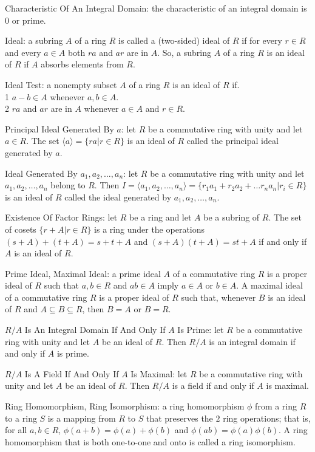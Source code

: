 Characteristic Of An Integral Domain: the characteristic of an integral domain is $0$ or prime.

Ideal: a subring $A$ of a ring $R$ is called a (two-sided) ideal of $R$ if for every $r \in R$ and every $a \in A$ both $ra$ and $ar$ are in $A$. So, a subring $A$ of a ring $R$ is an ideal of $R$ if $A$ absorbs elements from $R$.

Ideal Test: a nonempty subset $A$ of a ring $R$ is an ideal of $R$ if. \\
1 $a-b \in A$ whenever $a,b \in A$. \\
2 $ra$ and $ar$ are in $A$ whenever $a \in A$ and $r \in R$.

Principal Ideal Generated By $a$: let $R$ be a commutative ring with unity and let $a \in R$. The set $\langle a \rangle = \{ra | r \in R \}$ is an ideal of $R$ called the principal ideal generated by $a$.

Ideal Generated By $a_1,a_2,\dots,a_n$: let $R$ be a commutative ring with unity and let $a_1,a_2,\dots,a_n$ belong to $R$. Then $I = \langle a_1,a_2,\dots,a_n \rangle = \{r_1 a_1 + r_2 a_2 + \dots r_n a_n | r_i \in R \}$ is an ideal of $R$ called the ideal generated by $a_1,a_2,\dots,a_n$.

Existence Of Factor Rings: let $R$ be a ring and let $A$ be a subring of $R$. The set of cosets $\{ r+A | r \in R \}$ is a ring under the operations $(s+A)+(t+A)=s+t+A$ and $(s+A)(t+A)=st+A$ if and only if $A$ is an ideal of $R$.

Prime Ideal, Maximal Ideal: a prime ideal $A$ of a commutative ring $R$ is a proper ideal of $R$ such that $a,b \in R$ and $ab \in A$ imply $a \in A$ or $b \in A$. A maximal ideal of a commutative ring $R$ is a proper ideal of $R$ such that, whenever $B$ is an ideal of $R$ and $A \subseteq B \subseteq R$, then $B=A$ or $B=R$.

$R/A$ Is An Integral Domain If And Only If $A$ Is Prime: let $R$ be a commutative ring with unity and let $A$ be an ideal of $R$. Then $R/A$ is an integral domain if and only if $A$ is prime.

$R/A$ Is A Field If And Only If $A$ Is Maximal: let $R$ be a commutative ring with unity and let $A$ be an ideal of $R$. Then $R/A$ is a field if and only if $A$ is maximal.

Ring Homomorphism, Ring Isomorphism: a ring homomorphism $\phi$ from a ring $R$ to a ring $S$ is a mapping from $R$ to $S$ that preserves the $2$ ring operations; that is, for all $a,b \in R$, $\phi (a+b)=\phi (a)+\phi (b)$ and $\phi (ab)=\phi (a)\phi (b)$. A ring homomorphism that is both one-to-one and onto is called a ring isomorphism.

